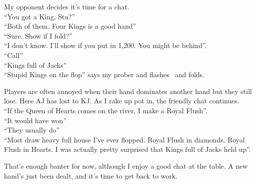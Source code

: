 My opponent decides it's time for a chat.\\
``You got a King, Stu?'' \\
``Both of them. Four Kings is a good hand'' \\
``Sure. Show if I fold?'' \\
``I don't know. I'll show if you put in 1,200. You might be behind''. \\
``Call'' \\
``Kings full of Jacks'' \\
``Stupid Kings on the flop'' says my prober and flashes \Ah\Jh\ and folds.


Players are often annoyed when their hand dominates another hand but they
still lose. Here AJ has lost to KJ. As I rake up pot in, the friendly
chat continues. \\
``If the Queen of Hearts comes on the river, I make a Royal Flush''. \\
``It would have won'' \\
``They usually do'' \\
``Most draw heavy full house I've ever flopped. Royal Flush in diamonds.
Royal Flush in Hearts. I was actually pretty surprised that Kings
full of Jacks held up''.

That's enough banter for now, although I enjoy a good chat at the table.
A new hand's just been dealt, and it's time to get back to work.


